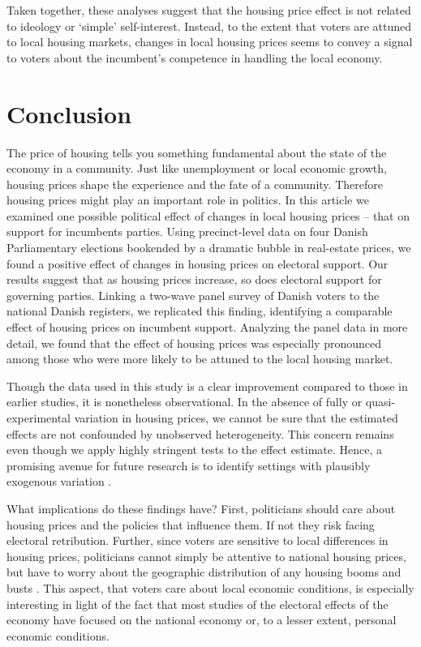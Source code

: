 \documentclass[12pt,a4paper]{article}
\begin{document}
	Taken together, these analyses suggest that the housing price effect is not related to ideology or `simple' self-interest. Instead, to the extent that voters are attuned to local housing markets, changes in local housing prices seems to convey a signal to voters about the incumbent's competence in handling the local economy.
	
	
	
	\section{Conclusion}
	The price of housing tells you something fundamental about the state of the economy in a community. Just like unemployment or local economic growth, housing prices shape the experience and the fate of a community. Therefore housing prices might play an important role in politics. In this article we examined one possible political effect of changes in local housing prices – that on support for incumbents parties. Using precinct-level data on four Danish Parliamentary elections bookended by a dramatic bubble in real-estate prices, we found a positive effect of changes in housing prices on electoral support. Our results suggest that as housing prices increase, so does electoral support for governing parties. Linking a two-wave panel survey of Danish voters to the national Danish registers, we replicated this finding, identifying a comparable effect of housing prices on incumbent support. Analyzing the panel data in more detail, we found that the effect of housing prices was especially pronounced among those who were more likely to be attuned to the local housing market. 
	
	Though the data used in this study is a clear improvement compared to those in earlier studies, it is nonetheless observational. In the absence of fully or quasi-experimental variation in housing prices, we cannot be sure that the estimated effects are not confounded by unobserved heterogeneity. This concern remains even though we apply highly stringent tests to the effect estimate. Hence, a promising avenue for future research is to identify settings with plausibly exogenous variation \citep[cf.]{jerzak2016property}.
	
	What implications do these findings have? First, politicians should care about housing prices and the policies that influence them. If not they risk facing electoral retribution. Further, since voters are sensitive to  local differences in housing prices, politicians cannot simply be attentive to national housing prices, but have to worry about the geographic distribution of any housing booms and busts \citep[cf.][11]{ferejohn1986incumbent}. This aspect, that voters care about local economic conditions, is especially interesting in light of the fact that most studies of the electoral effects of the economy have focused on the national economy or, to a lesser extent, personal economic conditions.
	
\end{document}
